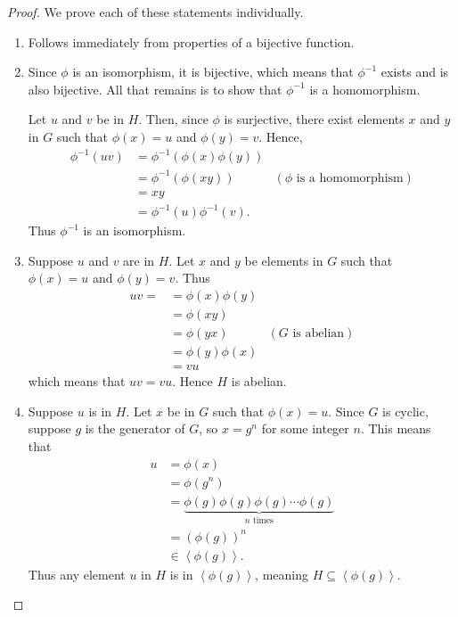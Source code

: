 \newpage

\begin{proof}
    We prove each of these statements individually.
    \begin{enumerate}
        \item Follows immediately from properties of a bijective function.

        \item Since $\phi$ is an isomorphism, it is bijective, which means that $\phi^{-1}$ exists and is also bijective. All that remains is to show that $\phi^{-1}$ is a homomorphism.

        Let $u$ and $v$ be in $H$. Then, since $\phi$ is surjective, there exist elements $x$ and $y$ in $G$ such that $\phi(x) = u$ and $\phi(y) = v$. Hence,
        \begin{align*}
            \phi^{-1}(uv) &= \phi^{-1}\left(\phi(x)\phi(y)\right)\\
            &= \phi^{-1}\left(\phi(xy)\right) & (\phi \text{ is a homomorphism})\\
            &= xy\\
            &= \phi^{-1}(u) \phi^{-1}(v).
        \end{align*}
        Thus $\phi^{-1}$ is an isomorphism.

        \item Suppose $u$ and $v$ are in $H$. Let $x$ and $y$ be elements in $G$ such that $\phi(x) = u$ and $\phi(y) = v$. Thus
        \begin{align*}
            uv = &= \phi(x)\phi(y) \\
            &= \phi(xy)\\
            &= \phi(yx) & (G \text{ is abelian})\\
            &= \phi(y)\phi(x)\\
            &= vu
        \end{align*}
        which means that $uv = vu$. Hence $H$ is abelian.

        \item Suppose $u$ is in $H$. Let $x$ be in $G$ such that $\phi(x) = u$. Since $G$ is cyclic, suppose $g$ is the generator of $G$, so $x = g^n$ for some integer $n$. This means that
        \begin{align*}
            u &= \phi(x)\\
            &= \phi(g^n)\\
            &= \underbrace{\phi(g)\phi(g)\phi(g)\cdots\phi(g)}_{n \text{ times}}\\
            &= \left(\phi(g)\right)^n\\
            &\in \left\langle \phi(g) \right\rangle.
        \end{align*}
        Thus any element $u$ in $H$ is in $\left\langle \phi(g) \right\rangle$, meaning $H \subseteq \left\langle \phi(g) \right\rangle$.


\end{enumerate}
\end{proof}
